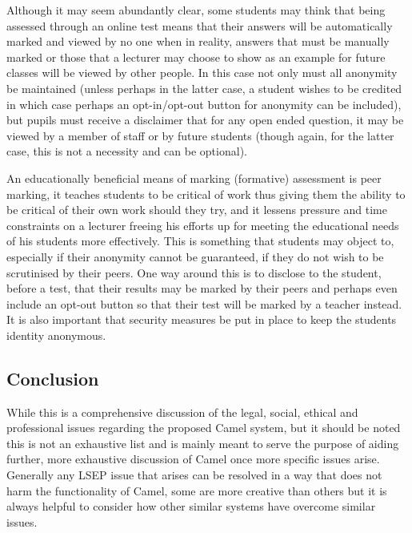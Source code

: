 Although it may seem abundantly clear, some students may think that being assessed through an online test means that their answers will be automatically marked and viewed by no one when in reality, answers that must be manually marked or those that a lecturer may choose to show as an example for future classes will be viewed by other people. In this case not only must all anonymity be maintained (unless perhaps in the latter case, a student wishes to be credited in which case perhaps an opt-in/opt-out button for anonymity can be included), but pupils must receive a disclaimer that for any open ended question, it may be viewed by a member of staff or by future students (though again, for the latter case, this is not a necessity and can be optional).

An educationally beneficial means of marking (formative) assessment is peer marking, it teaches students to be critical of work thus giving them the ability to be critical of their own work should they try, and it lessens pressure and time constraints on a lecturer freeing his efforts up for meeting the educational needs of his students more effectively. This is something that students may object to, especially if their anonymity cannot be guaranteed, if they do not wish to be scrutinised by their peers. One way around this is to disclose to the student, before a test, that their results may be marked by their peers and perhaps even include an opt-out button so that their test will be marked by a teacher instead. It is also important that security measures be put in place to keep the students identity anonymous.


\subsection*{Conclusion}
While this is a comprehensive discussion of the legal, social, ethical and professional issues regarding the proposed Camel system, but it should be noted this is not an exhaustive list and is mainly meant to serve the purpose of aiding further, more exhaustive discussion of Camel once more specific issues arise. Generally any LSEP issue that arises can be resolved in a way that does not harm the functionality of Camel, some are more creative than others but it is always helpful to consider how other similar systems have overcome similar issues.
